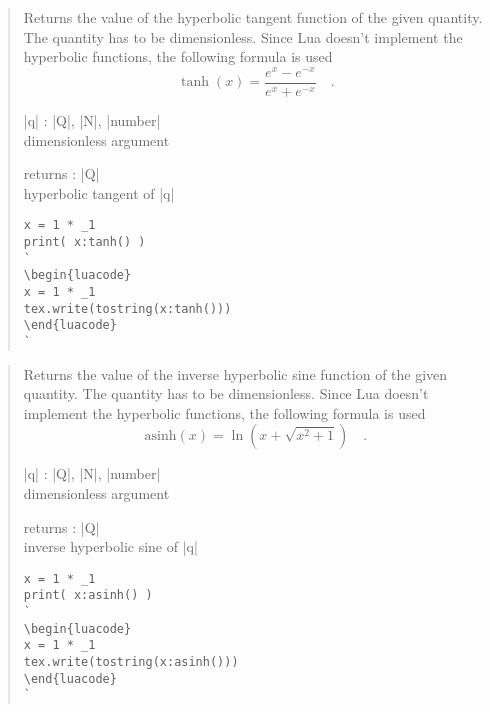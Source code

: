 \documentclass{ltxdoc}
\begin{document}
\begin{quote}
  Returns the value of the hyperbolic tangent function of the given quantity. The quantity has to be dimensionless. Since Lua doesn't implement the hyperbolic functions, the following formula is used
  \begin{equation*}
    \tanh(x) = \frac{e^x - e^{-x}}{e^x + e^{-x}} \quad.
  \end{equation*}

  \begin{description}
  \item |q| : |Q|, |N|, |number|\\
    dimensionless argument

  \item returns : |Q|\\
    hyperbolic tangent of |q|
  \end{description}

\begin{lstlisting}
x = 1 * _1
print( x:tanh() )
`
\begin{luacode}
x = 1 * _1
tex.write(tostring(x:tanh()))
\end{luacode}
`
\end{lstlisting}

\end{quote}




\begin{quote}
  Returns the value of the inverse hyperbolic sine function of the given quantity. The quantity has to be dimensionless. Since Lua doesn't implement the hyperbolic functions, the following formula is used
  \begin{equation*}
    \text{asinh}(x) = \ln\left( x + \sqrt{x^2 + 1} \right)  \quad.
  \end{equation*}

  \begin{description}
  \item |q| : |Q|, |N|, |number|\\
    dimensionless argument

  \item returns : |Q|\\
    inverse hyperbolic sine of |q|
  \end{description}


\begin{lstlisting}
x = 1 * _1
print( x:asinh() )
`
\begin{luacode}
x = 1 * _1
tex.write(tostring(x:asinh()))
\end{luacode}
`
\end{lstlisting}

\end{quote}
\end{document}
